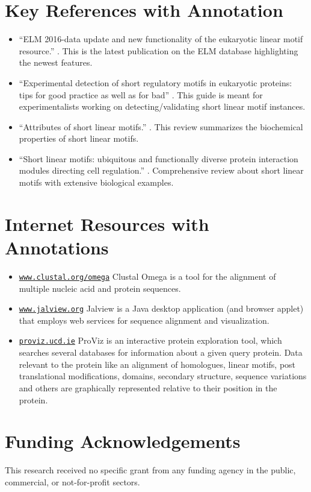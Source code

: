 \documentclass[12pt]{article}
\newcommand\rurl[1]{%
	\href{http://#1}{\nolinkurl{#1}}%
}
\begin{document}
%
%
\section*{Key References with Annotation}
\label{sec:key-references-with-annotation}

\begin{itemize}
\item ``ELM 2016-data update and new functionality of the
	eukaryotic linear motif resource.'' \citep{26615199}.
	This is the latest publication on the ELM database highlighting the
	newest features.

\item ``Experimental detection of short regulatory motifs in eukaryotic proteins: tips
	for good practice as well as for bad'' \citep{26581338}.
	This guide is meant for experimentalists working on detecting/validating short
	linear motif instances.

\item ``Attributes of short linear motifs.'' \citep{21909575}.
	This review summarizes the biochemical properties of short linear
	motifs.

\item ``Short linear motifs: ubiquitous and functionally diverse protein
    interaction modules directing cell regulation.'' \citep{24926813}.
	Comprehensive review about short linear motifs with extensive biological
	examples.

\end{itemize}


\section*{Internet Resources with Annotations}%
\label{sec:internet-resources-with-annotations}

\begin{itemize}

\item \rurl{www.clustal.org/omega} Clustal Omega \citep{21988835} is a tool
for the alignment of multiple nucleic acid and protein sequences.

\item \rurl{www.jalview.org} Jalview \citep{19151095} is a Java desktop
application (and browser applet) that employs web services for sequence
alignment and visualization.

\item \rurl{proviz.ucd.ie} ProViz \citep{27085803} is an interactive protein
exploration tool, which searches several databases for information about
a given query protein. Data relevant to the protein like an alignment of
homologues, linear motifs, post translational modifications, domains,
secondary structure, sequence variations and others are graphically
represented relative to their position in the protein.

\end{itemize}

\section*{Funding Acknowledgements}%
\label{sec:funding-acknowledgments}%
This research received no specific grant from any funding agency in the public, commercial, or not-for-profit sectors. 


\end{document}
